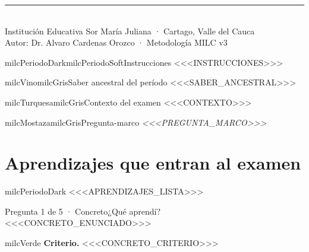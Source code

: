 \documentclass[11pt,letterpaper]{article}
\begin{document}
\noindent\textcolor{milcLinea}{\rule{\linewidth}{1pt}}\\[2mm]
{\sffamily\fontsize{10}{13}\selectfont Institución Educativa Sor María Juliana · Cartago, Valle del Cauca\\
Autor: Dr. Alvaro Cardenas Orozco · Metodología MILC v3}

\newpage



\begin{softbox}{milcPeriodoDark}{milcPeriodoSoft}{Instrucciones}
<<<INSTRUCCIONES>>>
\end{softbox}


\begin{softbox}{milcVino}{milcGris}{Saber ancestral del período}
<<<SABER_ANCESTRAL>>>
\end{softbox}

\begin{softbox}{milcTurquesa}{milcGris}{Contexto del examen}
<<<CONTEXTO>>>
\end{softbox}

\begin{softbox}{milcMostaza}{milcGris}{Pregunta-marco}
\textit{<<<PREGUNTA_MARCO>>>}
\end{softbox}


\section*{Aprendizajes que entran al examen}

\begin{infoband}{milcPeriodoDark}
<<<APRENDIZAJES_LISTA>>>
\end{infoband}

\newpage


\begin{cabecerapregunta}{Pregunta 1 de 5 · Concreto}{¿Qué aprendí?}
<<<CONCRETO_ENUNCIADO>>>
\end{cabecerapregunta}

\begin{infoband}{milcVerde}
\textbf{Criterio.} <<<CONCRETO_CRITERIO>>>
\end{infoband}
\end{document}
